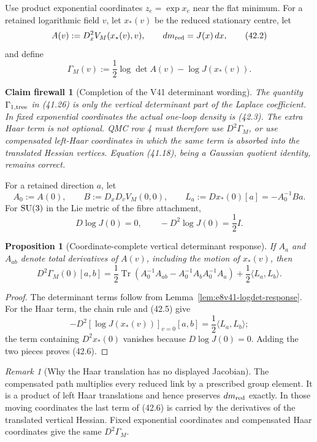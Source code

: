 \documentclass[11pt,oneside]{book}
\newtheorem{proposition}[theorem]{Proposition}
\newtheorem{firewall}[theorem]{Claim firewall}
\theoremstyle{definition}
\theoremstyle{remark}
\newtheorem{remark}[theorem]{Remark}
\newcommand{\Tr}{\operatorname{Tr}}
\begin{document}
Use product exponential coordinates \(z_e=\exp x_e\) near the flat
minimum.  For a retained logarithmic field \(v\), let \(x_*(v)\) be
the reduced stationary centre, let
\[
 A(v):=D_x^2V_M(x_*(v),v),
 \qquad dm_{\rm red}=J(x)\,dx,                                  \tag{42.2}
\]
and define
\[
 \Gamma_M(v):=\frac12\log\det A(v)-\log J(x_*(v)).              \tag{42.3}
\]

\begin{firewall}[Completion of the V41 determinant wording]
\label{fire:e8v42-Haar-completion}
The quantity \(\Gamma_{1,{\rm tree}}\) in (41.26) is only the
vertical determinant part of the Laplace coefficient.  In fixed
exponential coordinates the actual one-loop density is (42.3).
The extra Haar term is not optional.  QMC row 4 must therefore use
\(D^2\Gamma_M\), or use compensated left-Haar coordinates in which
the same term is absorbed into the translated Hessian vertices.
Equation (41.18), being a Gaussian quotient identity, remains
correct.
\end{firewall}

For a retained direction \(a\), let
\[
 A_0:=A(0),\qquad
 B:=D_xD_vV_M(0,0),\qquad
 L_a:=D x_*(0)[a]=-A_0^{-1}Ba.                                 \tag{42.4}
\]
For \({\rm SU}(3)\) in the Lie metric of the fibre attachment,
\[
 D\log J(0)=0,\qquad -D^2\log J(0)=\frac12I.                   \tag{42.5}
\]

\begin{proposition}[Coordinate-complete vertical determinant response]
\label{prop:e8v42-coordinate-complete}
If \(A_a\) and \(A_{ab}\) denote total derivatives of \(A(v)\),
including the motion of \(x_*(v)\), then
\[
 \boxed{
 D^2\Gamma_M(0)[a,b]
 =\frac12\Tr\!\left(A_0^{-1}A_{ab}
 -A_0^{-1}A_bA_0^{-1}A_a\right)
 +\frac12\langle L_a,L_b\rangle.}                              \tag{42.6}
\]
\end{proposition}

\begin{proof}
The determinant terms follow from
Lemma~\ref{lem:e8v41-logdet-response}.  For the Haar term, the chain
rule and (42.5) give
\[
 -D^2[\log J(x_*(v))]_{v=0}[a,b]
 =\frac12\langle L_a,L_b\rangle;
\]
the term containing \(D^2x_*(0)\) vanishes because
\(D\log J(0)=0\).  Adding the two pieces proves (42.6).
\end{proof}

\begin{remark}[Why the Haar translation has no displayed Jacobian]
\label{rem:e8v42-Haar-translation}
The compensated path multiplies every reduced link by a prescribed
group element.  It is a product of left Haar translations and hence
preserves \(dm_{\rm red}\) exactly.  In those moving coordinates the
last term of (42.6) is carried by the derivatives of the translated
vertical Hessian.  Fixed exponential coordinates and compensated
Haar coordinates give the same \(D^2\Gamma_M\).
\end{remark}
\end{document}
